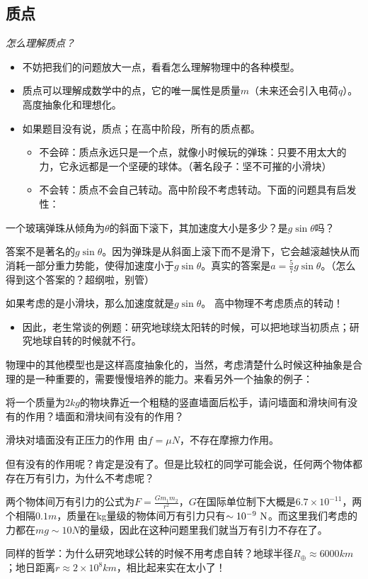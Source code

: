 \documentclass[a4paper,9pt]{ctexart}
\begin{document}
\subsection{质点}
\emph{怎么理解质点？}
\begin{itemize}
\item
不妨把我们的问题放大一点，看看怎么理解物理中的各种模型。
\item
质点可以理解成数学中的点，它的唯一属性是质量$m$（未来还会引入电荷$q$）。\so 高度抽象化和理想化。
\item
如果题目没有说，质点；在高中阶段，所有的质点都。
\begin{itemize}
\item
不会碎：质点永远只是一个点，就像小时候玩的弹珠：只要不用太大的力，它永远都是一个坚硬的球体。（著名段子：坚不可摧的小滑块）
\item
不会转：质点不会自己转动。高中阶段不考虑转动。下面的问题具有启发性：
\end{itemize}
\end{itemize}
\begin{eg}
一个玻璃弹珠从倾角为$\theta$的斜面下滚下，其加速度大小是多少？是$g\sin \theta$吗？
\end{eg}
\begin{ans}
答案不是著名的$g\sin \theta$。因为弹珠是从斜面上滚下而不是滑下，它会越滚越快从而消耗一部分重力势能，使得加速度小于$g\sin \theta$。真实的答案是$a=\frac{5}{7}g\sin \theta$。（怎么得到这个答案的？超纲啦，别管）
\end{ans}
如果考虑的是小滑块，那么加速度就是$g\sin \theta$。 \so 高中物理不考虑质点的转动！
\begin{itemize}
\item
因此，老生常谈的例题：研究地球绕太阳转的时候，可以把地球当初质点；研究地球自转的时候就不行。
\end{itemize}
物理中的其他模型也是这样高度抽象化的，当然，考虑清楚什么时候这种抽象是合理的是一种重要的，需要慢慢培养的能力。来看另外一个抽象的例子：
\begin{eg}
将一个质量为$2\unit{kg}$的物块靠近一个粗糙的竖直墙面后松手，请问墙面和滑块间有没有的作用？墙面和滑块间有没有的作用？
\end{eg}
\begin{ans}
滑块对墙面没有正压力的作用 \so 由$f = \mu N$，不存在摩擦力作用。
\par
但有没有的作用呢？肯定是没有了。但是比较杠的同学可能会说，任何两个物体都存在万有引力，为什么不考虑呢？
\par
两个物体间万有引力的公式为$F = \frac{Gm_1m_2}{r^2}$，$G$在国际单位制下大概是$6.7\times 10^{-11}$，两个相隔$0.1\unit{m}$，质量在kg量级的物体间万有引力只有$\sim 10^{-9} {\rm \ N}$。而这里我们考虑的力都在$mg \sim 10\unit{N}$的量级，因此在这种问题里我们就当万有引力不存在了。
\end{ans}
同样的哲学：为什么研究地球公转的时候不用考虑自转？地球半径$R_\oplus \approx 6000\unit{km}$；地日距离$r \approx 2\times 10^8 \unit{km}$，相比起来实在太小了！
\end{document}
